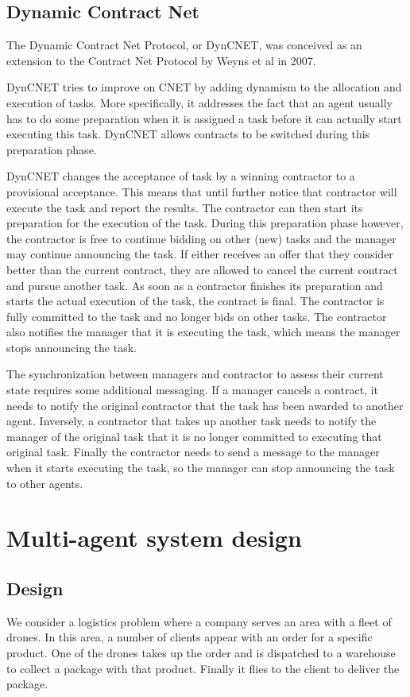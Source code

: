 \documentclass[10pt,a4paper]{article}
\newcommand{\outline}[1]{\todo[inline, caption={}, color=cyan]{\emph{Outline of what should come here}: #1}}
\begin{document}
\subsection{Dynamic Contract Net}
The Dynamic Contract Net Protocol, or DynCNET, was conceived as an extension to the Contract Net Protocol by Weyns et al in 2007. \cite{DynCNET}

DynCNET tries to improve on CNET by adding dynamism to the allocation and execution of tasks. More specifically, it addresses the fact that an agent usually has to do some preparation when it is assigned a task before it can actually start executing this task. DynCNET allows contracts to be switched during this preparation phase.

DynCNET changes the acceptance of task by a winning contractor to a provisional acceptance. This means that until further notice that contractor will execute the task and report the results. The contractor can then start its preparation for the execution of the task. During this preparation phase however, the contractor is free to continue bidding on other (new) tasks and the manager may continue announcing the task. If either receives an offer that they consider better than the current contract, they are allowed to cancel the current contract and pursue another task. As soon as a contractor finishes its preparation and starts the actual execution of the task, the contract is final. The contractor is fully committed to the task and no longer bids on other tasks. The contractor also notifies the manager that it is executing the task, which means the manager stops announcing the task.

The synchronization between managers and contractor to assess their current state requires some additional messaging. If a manager cancels a contract, it needs to notify the original contractor that the task has been awarded to another agent. Inversely, a contractor that takes up another task needs to notify the manager of the original task that it is no longer committed to executing that original task. Finally the contractor needs to send a message to the manager when it starts executing the task, so the manager can stop announcing the task to other agents.

\section{Multi-agent system design}
\outline{Wat wij concreet doen}
\subsection{Design}
We consider a logistics problem where a company serves an area with a fleet of drones. In this area, a number of clients appear with an order for a specific product. One of the drones takes up the order and is dispatched to a warehouse to collect a package with that product. Finally it flies to the client to deliver the package.
\end{document}
